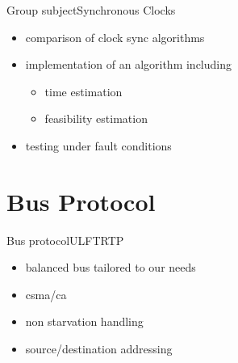 \documentclass{beamer}
\begin{document}
\begin{frame}{Group subject}{Synchronous Clocks}
  \begin{itemize}
    \item \begin{large}comparison of clock sync algorithms\end{large}
    \item \begin{large}implementation of an algorithm including\end{large}
      \begin{itemize}
	\item time estimation
	\item feasibility estimation
      \end{itemize}
    \item \begin{large}testing under fault conditions\end{large}
  \end{itemize}
\end{frame}

\section{Bus Protocol}
\begin{frame}{Bus protocol}{ULFTRTP}
\begin{center}
\begin{itemize}
  \item \begin{large}balanced bus tailored to our needs\end{large}
  \item \begin{large}csma/ca\end{large}
 \item \begin{large}non starvation handling\end{large}
 \item \begin{large}source/destination addressing\end{large}
\end{itemize}
\end{center}
\end{frame}
\end{document}
